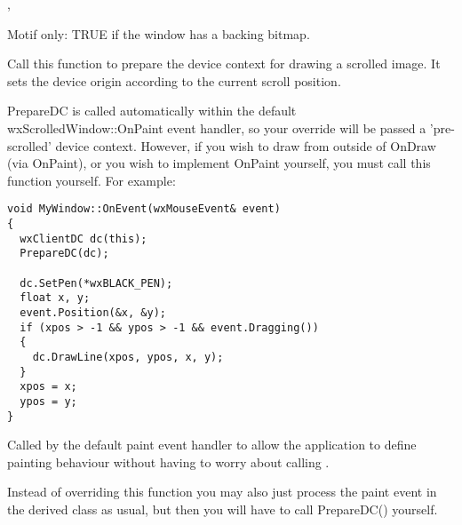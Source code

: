 
,\rtfsp
{}



\label{wxscrolledwindowisretained}


Motif only: TRUE if the window has a backing bitmap.

\label{wxscrolledwindowpreparedc}


Call this function to prepare the device context for drawing a scrolled image. It
sets the device origin according to the current scroll position.

PrepareDC is called automatically within the default wxScrolledWindow::OnPaint event
handler, so your  override
will be passed a 'pre-scrolled' device context. However, if you wish to draw from
outside of OnDraw (via OnPaint), or you wish to implement OnPaint yourself, you must
call this function yourself. For example:

\begin{verbatim}
void MyWindow::OnEvent(wxMouseEvent& event)
{
  wxClientDC dc(this);
  PrepareDC(dc);

  dc.SetPen(*wxBLACK_PEN);
  float x, y;
  event.Position(&x, &y);
  if (xpos > -1 && ypos > -1 && event.Dragging())
  {
    dc.DrawLine(xpos, ypos, x, y);
  }
  xpos = x;
  ypos = y;
}
\end{verbatim}

\label{wxscrolledwindowondraw}


Called by the default paint event handler to allow the application to define
painting behaviour without having to worry about calling
.

Instead of overriding this function you may also just process the paint event
in the derived class as usual, but then you will have to call PrepareDC()
yourself.

